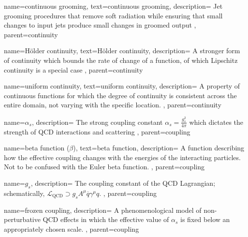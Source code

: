     {
        name=continuous grooming,
        text=continuous grooming,
        description={
            Jet grooming procedures that remove soft radiation while ensuring that small changes to input jets produce small changes in groomed output
        },
        parent=continuity
    }


    {
        name=H\"older continuity,
        text=H\"older continuity,
        description={
            A stronger form of continuity which bounds the rate of change of a function, of which Lipschitz continuity is a special case
        },
        parent=continuity
    }


    {
        name=uniform continuity,
        text=uniform continuity,
        description={
            A property of continuous functions for which the degree of continuity is consistent across the entire domain, not varying with the specific location.
        },
        parent=continuity
    }



    {
      name=\ensuremath{\alpha_s},
      description={
          The strong coupling constant \(\alpha_s = \frac{g_s^2}{4\pi}\) which dictates the strength of QCD interactions and scattering
    },
    parent=coupling
    }

    {
        name=beta function (\ensuremath{\beta}),
        text=beta function,
        description={%
            A function describing how the effective coupling changes with the energies of the interacting particles.
            Not to be confused with the Euler beta function.
        },
        parent=coupling
    }

    {
      name=\ensuremath{g_s},
      description={
          The coupling constant of the QCD Lagrangian;
          schematically, \(\mathcal{L}_\text{QCD} \supset g_s A^\mu \overline{q} \gamma^\mu q\).
      },
      parent=coupling
    }


    {
      name=frozen coupling,
      description={
          A phenomenological model of non-perturbative QCD effects in which the effective value of \(\alpha_s\) is fixed below an appropriately chosen scale.
      },
      parent=coupling
    }





